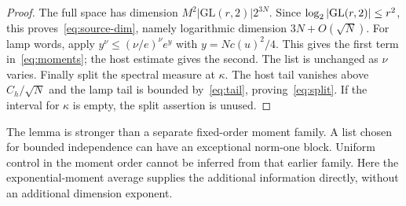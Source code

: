 \begin{proof}
The full space has dimension $M^2|\mathrm{GL}(r,2)|2^{3N}$. Since $\log_2|\mathrm{GL}(r,2)|\le r^2$, this proves~\eqref{eq:source-dim}, namely logarithmic dimension $3N+O(\sqrt N)$. For lamp words, apply $y^\nu\le(\nu/e)^\nu e^y$ with $y=Nc(u)^2/4$. This gives the first term in~\eqref{eq:moments}; the host estimate gives the second. The list is unchanged as $\nu$ varies. Finally split the spectral measure at $\kappa$. The host tail vanishes above $C_h/\sqrt N$ and the lamp tail is bounded by~\eqref{eq:tail}, proving~\eqref{eq:split}. If the interval for $\kappa$ is empty, the split assertion is unused.
\end{proof}

The lemma is stronger than a separate fixed-order moment family. A list chosen for bounded independence can have an exceptional norm-one block. Uniform control in the moment order cannot be inferred from that earlier family. Here the exponential-moment average supplies the additional information directly, without an additional dimension exponent.
